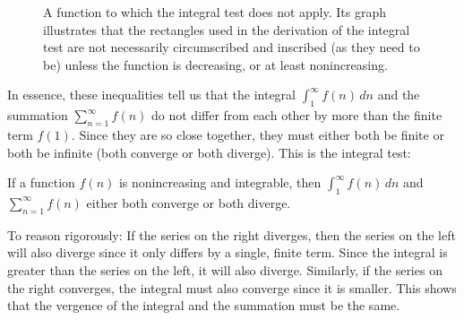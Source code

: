 \documentclass{myarticle}
\theoremstyle{nospace}
\newtheorem{old series theorem}{Theorem}
\newenvironment{series theorem}
{\begin{mdframed}\begin{old series theorem}}
    {\end{old series theorem}\end{mdframed}}
\begin{document}
\begin{figure}[htb!] \centering
  \caption{A function to which the integral test does not apply. Its
    graph illustrates that the rectangles used in the derivation of
    the integral test are not necessarily circumscribed and inscribed
    (as they need to be) unless the function is decreasing, or at
    least nonincreasing.}
  \label{fig:integral test fails}
\end{figure}

In essence, these inequalities tell us that the integral
$\int_1^\infty f(n) \,dn$ and the summation $\sum_{n=1}^\infty f(n)$
do not differ from each other by more than the finite term $f(1)$.
Since they are so close together, they must either both be finite or
both be infinite (both converge or both diverge). This is the integral
test:

\begin{series theorem}
  If a function $f(n)$ is nonincreasing and integrable, then
  $\int_1^\infty f(n) \,dn$ and $\sum_{n=1}^\infty f(n)$ either both
  converge or both diverge.
\end{series theorem}

To reason rigorously: If the series on the right diverges, then the
series on the left will also diverge since it only differs by a
single, finite term. Since the integral is greater than the series on
the left, it will also diverge. Similarly, if the series on the right
converges, the integral must also converge since it is smaller. This
shows that the vergence of the integral and the summation must be the
same.
\end{document}
